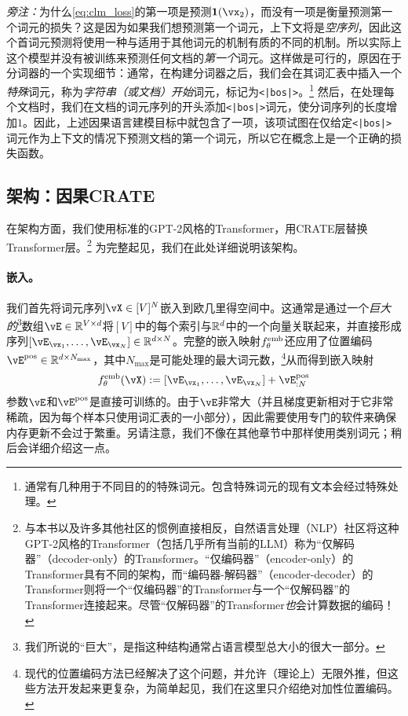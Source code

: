 \documentclass[../../book-main.tex]{subfiles}
\begin{document}
\textit{旁注：}为什么\eqref{eq:clm_loss}的第一项是预测\(\vone(\vx_{2})\)，而没有一项是衡量预测第一个词元的损失？这是因为如果我们想预测第一个词元，上下文将是\textit{空序列}，因此这个首词元预测将使用一种与适用于其他词元的机制有质的不同的机制。所以实际上这个模型并没有被训练来预测任何文档的\textit{第一个}词元。这样做是可行的，原因在于分词器的一个实现细节：通常，在构建分词器之后，我们会在其词汇表中插入一个\textit{特殊}词元，称为\textit{字符串（或文档）开始}词元，标记为\texttt{<|bos|>}。\footnote{通常有几种用于不同目的的特殊词元。包含特殊词元的现有文本会经过特殊处理。} 然后，在处理每个文档时，我们在文档的词元序列的开头添加\texttt{<|bos|>}词元，使分词序列的长度增加\(1\)。因此，上述因果语言建模目标中就包含了一项，该项试图在仅给定\texttt{<|bos|>}词元作为上下文的情况下预测文档的第一个词元，所以它在概念上是一个正确的损失函数。

\subsection{架构：因果CRATE}

在架构方面，我们使用标准的GPT-2风格的Transformer，用CRATE层替换Transformer层。\footnote{与本书以及许多其他社区的惯例直接相反，自然语言处理（NLP）社区将这种GPT-2风格的Transformer（包括几乎所有当前的LLM）称为“仅解码器”（decoder-only）的Transformer。“仅编码器”（encoder-only）的Transformer具有不同的架构，而“编码器-解码器”（encoder-decoder）的Transformer则将一个“仅编码器”的Transformer与一个“仅解码器”的Transformer连接起来。尽管“仅解码器”的Transformer\textit{也}会计算数据的编码！} 为完整起见，我们在此处详细说明该架构。

\paragraph{嵌入。} 我们首先将词元序列\(\vX \in [V]^{N}\)嵌入到欧几里得空间中。这通常是通过一个\textit{巨大的}\footnote{我们所说的“巨大”，是指这种结构通常占语言模型总大小的很大一部分。}数组\(\vE \in \R^{V \times d}\)将\([V]\)中的每个索引与\(\mathbb{R}^{d}\)中的一个向量关联起来，并直接形成序列\([\vE_{\vx_{1}}, \dots, \vE_{\vx_{N}}] \in \R^{d \times N}\)。完整的嵌入映射\(f_{\theta}^{\mathrm{emb}}\)还应用了位置编码\(\vE^{\pos} \in \R^{d  \times N_{\max}}\)，其中\(N_{\max}\)是可能处理的最大词元数，\footnote{现代的位置编码方法已经解决了这个问题，并允许（理论上）无限外推，但这些方法开发起来更复杂，为简单起见，我们在这里只介绍绝对加性位置编码。}从而得到嵌入映射
\begin{equation}
    f_{\theta}^{\emb}(\vX) := [\vE_{\vx_{1}}, \dots, \vE_{\vx_{N}}] + \vE_{:N}^{\pos}
\end{equation}
参数\(\vE\)和\(\vE^{\pos}\)是直接可训练的。由于\(\vE\)非常大（并且梯度更新相对于它非常稀疏，因为每个样本只使用词汇表的一小部分），因此需要使用专门的软件来确保内存更新不会过于繁重。另请注意，我们不像在其他章节中那样使用类别词元；稍后会详细介绍这一点。
\end{document}

